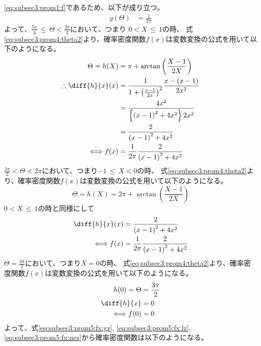 \begin{enumerate}[(1)]
    \eqref{eq:subsec3:prom1:f}であるため、以下が成り立つ。
    \begin{align*}
        g(\Theta) &= \frac{1}{2\pi}
    \end{align*}
    よって、$\frac{5\pi}{4}\, \leq\, \Theta < \frac{3\pi}{2}$において、つまり $0 < X\, \leq\, 1$の時、
    式\eqref{eq:subsec3:prom4:theta2}より、確率密度関数$f(x)$は変数変換の公式を用いて以下のようになる。
    \begin{align}
        \Theta = h(X) &= \pi + \arctan\left(\frac{X - 1}{2X}\right) \nonumber\\
        \therefore \diff{h}{x}(x) &= \frac{1}{1 + \left(\frac{x - 1}{2x}\right)^2}\frac{x - (x - 1)}{2x^2}\nonumber\\
        &= \frac{4x^2}{\left\{\left(x - 1\right)^2 + 4x^2\right\}2x^2}\nonumber\\
        &= \frac{2}{\left(x - 1\right)^2 + 4x^2}\nonumber\\
        \Longleftrightarrow f(x) &= \frac{1}{2\pi}\frac{2}{\left(x - 1\right)^2 + 4x^2}\label{eq:subsec3:prom5:fx:gz}
    \end{align}
    $\frac{3\pi}{2} < \Theta < 2\pi$において、つまり$-1\, \leq\, X < 0$の時、
    式\eqref{eq:subsec3:prom4:theta2}より、確率密度関数$f(x)$は変数変換の公式を用いて以下のようになる。
    \begin{equation*}
        \Theta = h(X) = 2\pi + \arctan\left(\frac{X - 1}{2X}\right)
    \end{equation*}
    $0 < X\, \leq\, 1$の時と同様にして
    \begin{align}
        \diff{h}{x}(x) &= \frac{2}{\left(x - 1\right)^2 + 4x^2}\nonumber\\
        \Longleftrightarrow f(x) &= \frac{1}{2\pi}\frac{2}{\left(x - 1\right)^2 + 4x^2}\label{eq:subsec3:prom5:fx:lz}
    \end{align}
    $\Theta = \frac{3\pi}{2}$において、つまり$X = 0$の時、
    式\eqref{eq:subsec3:prom4:theta2}より、確率密度関数$f(x)$は変数変換の公式を用いて以下のようになる。
    \begin{align}
        h(0) = \Theta &= \frac{3\pi}{2}\nonumber\\
        \diff{h}{x} &= 0\nonumber\\
        \Longleftrightarrow f(0) &= 0\label{eq:subsec3:prom5:fx:nez}
    \end{align}
    よって、式\eqref{eq:subsec3:prom5:fx:gz}, \eqref{eq:subsec3:prom5:fx:lz}, \eqref{eq:subsec3:prom5:fx:nez}から確率密度関数は以下のようになる。
    \begin{equation*}

\end{equation*}
\end{enumerate}
